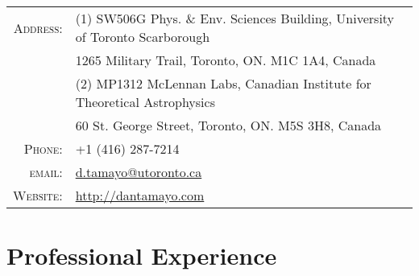 \documentclass[10pt]{article} %
\begin{document}
\pagestyle{empty} %


\par{\bigskip\par} %

\section{}

\begin{tabular}{rl}
\textsc{Address:} & (1) SW506G Phys. \& Env. Sciences Building, University of Toronto Scarborough \\
& 1265 Military Trail, Toronto, ON. M1C 1A4, Canada \\
& (2) MP1312 McLennan Labs, Canadian Institute for Theoretical Astrophysics \\
& 60 St. George Street, Toronto, ON. M5S 3H8, Canada \\
\textsc{Phone:} & +1 (416) 287-7214 \\
\textsc{email:} &  \href{mailto:d.tamayo@utoronto.ca}{d.tamayo@utoronto.ca} \\
\textsc{Website:} & \href{http://dantamayo.com}{http://dantamayo.com} \\
\end{tabular}


\section{Professional Experience}
\end{document}
